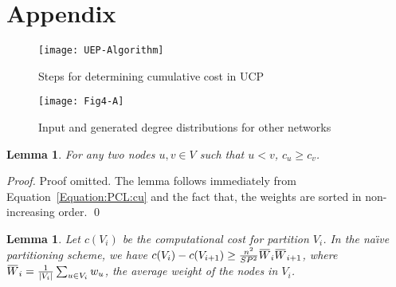 \documentclass[conference,letterpaper,10pt]{IEEEtran}
\newtheorem{lemma}[theorem]{Lemma}
\newcommand{\overbar}[1]{\mkern 1.5mu\overline{\mkern-1.5mu#1\mkern-1.5mu}\mkern 1.5mu}
\begin{document}



 \section{Appendix}
 \label{Section:Appendix}
 
 \begin{figure*}[ht!]
 \centering
{\texttt{[image: UEP-Algorithm]}}
 \caption{Steps for determining cumulative cost in UCP}
 \label{Figure:PCL:uep-scheme}
 \end{figure*}
 
 \begin{figure*}[ht!]
 \centering
{\texttt{[image: Fig4-A]}}
 \caption{Input and generated degree distributions for other networks}
 \label{Figure:PCL:OtherNetworks}
 \end{figure*}
 
\begin{lemma}
\label{lemma:eugeqev}
For any two nodes $u,v \in V$ such that $u<v$, $c_{u} \geq c_{v}$.
\end{lemma}
\begin{proof}
Proof omitted. The lemma follows immediately from Equation~\ref{Equation:PCL:cu} and the fact that, the weights are sorted in non-increasing order. 
\qed
\end{proof}


\begin{lemma}
\label{lemma:unp}
Let $c(V_i)$ be the computational cost for partition $V_i$. In the na\"{\i}ve partitioning scheme, we have $c(V_i) - c(V_{i+1}) \ge \frac{n^2}{SP^2} \overbar{W}_{i}\overbar{W}_{i+1}$, where $\overbar{W}_{i} = \frac{1}{|V_i|}\sum_{u\in V_i}{w_u}$, the average weight of the nodes in $V_i$.
\end{lemma}
\end{document}
